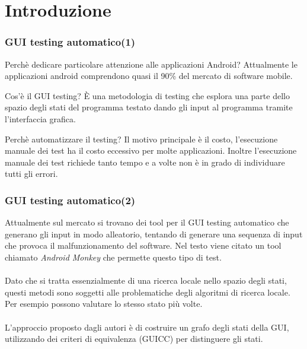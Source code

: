 \documentclass[12pt]{beamer}
\begin{document}
\section{Introduzione}
\begin{frame}
    \frametitle{GUI testing automatico(1)}
    \begin{block}{Perch\`e dedicare particolare attenzione alle applicazioni Android?}
        Attualmente le applicazioni android comprendono quasi il 90\% del mercato di software mobile.

    \end{block}
    \begin{block}{Cos'\`e il GUI testing?}
        \`E una metodologia di testing che esplora una parte dello spazio degli stati del programma testato dando gli input al programma tramite l'interfaccia grafica.
    \end{block}
    \begin{block}{Perch\`e automatizzare il testing?}
        Il motivo principale \`e il costo, l'esecuzione manuale dei test ha il costo eccessivo per molte applicazioni.
        Inoltre l'esecuzione manuale dei test richiede tanto tempo e a volte non \`e in grado di individuare tutti gli errori.
    \end{block}


\end{frame}

\begin{frame}
    \frametitle{GUI testing automatico(2)}
Attualmente sul mercato si trovano dei tool per il GUI testing automatico che generano gli input in modo alleatorio, tentando di generare una sequenza di input che provoca il malfunzionamento del software.
Nel testo viene citato un tool chiamato \emph{Android Monkey} che permette questo tipo di test.
\\~\\
Dato che si tratta essenzialmente di una ricerca locale nello spazio degli stati, questi metodi sono soggetti alle problematiche degli algoritmi di ricerca locale. Per esempio possono valutare lo stesso stato pi\`u volte.
\\~\\
L'approccio proposto dagli autori \`e di costruire un grafo degli stati della GUI, utilizzando dei criteri di equivalenza (GUICC) per distinguere gli stati.
\end{frame}
\end{document}
